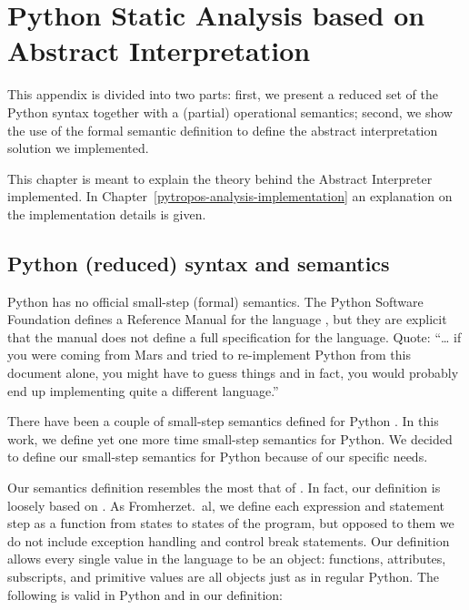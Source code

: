 \chapter{Python Static Analysis based on Abstract Interpretation}%
\label{appendix-ai-theory}

This appendix is divided into two parts: first, we present a reduced set of the Python
syntax together with a (partial) operational semantics; second, we show the use of the
formal semantic definition to define the abstract interpretation solution we implemented.

This chapter is meant to explain the theory behind the Abstract Interpreter implemented.
In Chapter~\ref{pytropos-analysis-implementation} an explanation on the implementation
details is given.

\section{Python (reduced) syntax and semantics}

Python has no official small-step (formal) semantics. The Python Software Foundation
defines a Reference Manual for the language
\autocite{python_software_foundation_python_2019}, but they are explicit that the manual
does not define a full specification for the language. Quote: \enquote{\ldots{} if you
were coming from Mars and tried to re-implement Python from this document alone, you might
have to guess things and in fact, you would probably end up implementing quite a different
language.}

There have been a couple of small-step semantics defined for Python
\autocites{politz_python_2013}{fromherz_static_2018}{guth_formal_2013}{ranson_semantics_2008}.
In this work, we define yet one more time small-step semantics for Python. We decided to
define our small-step semantics for Python because of our specific needs.

Our semantics definition resembles the most that of \textcite{fromherz_static_2018}. In
fact, our
definition is loosely based on \textcite{fromherz_static_2018}. As Fromherzet.~al, we
define each expression and statement step as a function from states to states of the
program, but opposed to them we do not include exception handling and control break statements.
Our definition allows every single value in the language to be an object: functions,
attributes, subscripts, and primitive values are all objects just as in regular Python.
The following is valid in Python and in our definition:

